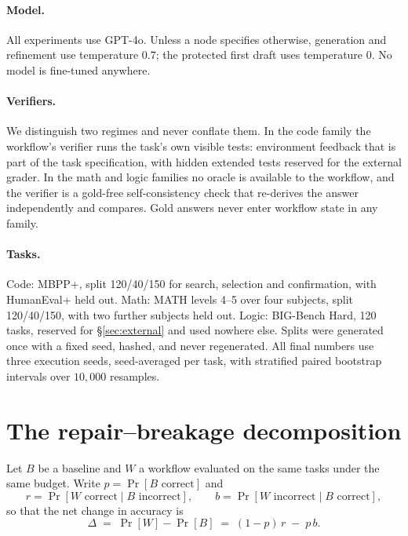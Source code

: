 \documentclass{article}
\newcommand{\rrate}{r}
\newcommand{\brate}{b}
\begin{document}
\paragraph{Model.} All experiments use GPT-4o. Unless a node specifies
otherwise, generation and refinement use temperature $0.7$; the protected first
draft uses temperature $0$. No model is fine-tuned anywhere.

\paragraph{Verifiers.} We distinguish two regimes and never conflate them. In
the code family the workflow's verifier runs the task's own visible tests:
environment feedback that is part of the task specification, with hidden
extended tests reserved for the external grader. In the math and logic families
no oracle is available to the workflow, and the verifier is a gold-free
self-consistency check that re-derives the answer independently and compares.
Gold answers never enter workflow state in any family.

\paragraph{Tasks.} Code: MBPP+, split 120/40/150 for search, selection and
confirmation, with HumanEval+ held out. Math: MATH levels 4--5 over four
subjects, split 120/40/150, with two further subjects held out. Logic:
BIG-Bench Hard, 120 tasks, reserved for \S\ref{sec:external} and used nowhere
else. Splits were generated once with a fixed seed, hashed, and never
regenerated. All final numbers use three execution seeds, seed-averaged per
task, with stratified paired bootstrap intervals over $10{,}000$ resamples.

\section{The repair--breakage decomposition}
\label{sec:theory}

Let $B$ be a baseline and $W$ a workflow evaluated on the same tasks under the
same budget. Write $p=\Pr[B\text{ correct}]$ and
\begin{equation}
\rrate = \Pr[W \text{ correct} \mid B \text{ incorrect}], \qquad
\brate = \Pr[W \text{ incorrect} \mid B \text{ correct}],
\end{equation}
so that the net change in accuracy is
\begin{equation}
\Delta \;=\; \Pr[W] - \Pr[B] \;=\; (1-p)\,\rrate \;-\; p\,\brate.
\label{eq:identity}
\end{equation}
\end{document}

